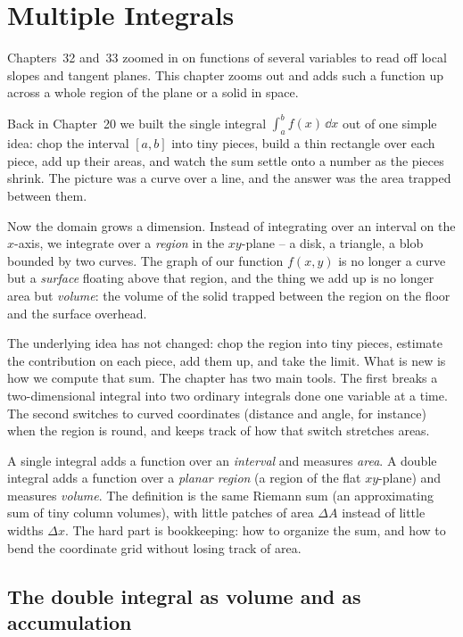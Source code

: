 \chapter{Multiple Integrals}

Chapters~32 and~33 zoomed in on functions of several variables to read off local
slopes and tangent planes. This chapter zooms out and adds such a function up
across a whole region of the plane or a solid in space.

Back in Chapter~20 we built the single integral $\int_a^b f(x)\,\dd x$ out of one
simple idea: chop the interval $[a,b]$ into tiny pieces, build a thin
rectangle over each piece, add up their areas, and watch the sum settle onto a
number as the pieces shrink. The picture was a curve over a line, and the answer
was the area trapped between them.

Now the domain grows a dimension. Instead of integrating over an interval on the
$x$-axis, we integrate over a \emph{region} in the $xy$-plane -- a disk, a
triangle, a blob bounded by two curves. The graph of our function $f(x,y)$ is no
longer a curve but a \emph{surface} floating above that region, and the thing we
add up is no longer area but \emph{volume}: the volume of the solid trapped
between the region on the floor and the surface overhead.

The underlying idea has not changed: chop the region into tiny pieces,
estimate the contribution on each piece, add them up, and take the limit. What is
new is how we compute that sum. The chapter has two main tools. The first breaks
a two-dimensional integral into two ordinary integrals done one variable at a
time. The second switches to curved coordinates (distance and angle, for
instance) when the region is round, and keeps track of how that switch stretches
areas.

\begin{focusbox}
A single integral adds a function over an \emph{interval} and measures
\emph{area}. A double integral adds a function over a \emph{planar region} (a
region of the flat $xy$-plane) and measures \emph{volume}. The definition is the
same Riemann sum (an approximating sum of tiny column volumes), with little
patches of area $\Delta A$ instead of little widths $\Delta x$. The hard part is
bookkeeping: how to organize the sum, and how to bend the coordinate grid without
losing track of area.
\end{focusbox}

\chapterline

\section{The double integral as volume and as accumulation}
\label{ch34:double}

